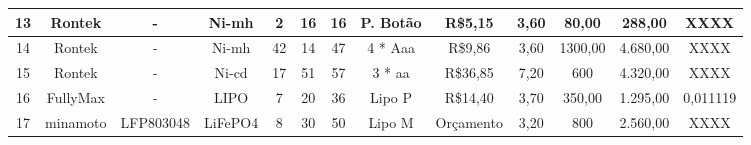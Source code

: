 \begin{table}[htp]
\begin{tabular}{|c|c|c|c|c|c|c|c|c|c|c|c|c|}
13                                               & Rontek                                      & -                                            & Ni-mh                                                & 2          & 16        & 16        & P. Botão                                                & R\$5,15                                     & 3,60                                                     & 80,00                                     & 288,00                                   & XXXX                                           \\[2pt] \hline
14                                               & Rontek                                      & -                                            & Ni-mh                                                & 42         & 14        & 47        & 4 * Aaa                                                 & R\$9,86                                     & 3,60                                                     & 1300,00                                   & 4.680,00                                 & XXXX                                           \\[2pt] \hline
15                                               & Rontek                                      & -                                            & Ni-cd                                                & 17         & 51        & 57        & 3 * aa                                                  & R\$36,85                                    & 7,20                                                     & 600                                       & 4.320,00                                 & XXXX                                           \\[2pt] \hline
16                                               & FullyMax                                    & -                                            & LIPO                                                 & 7          & 20        & 36        & Lipo P                                                  & R\$14,40                                    & 3,70                                                     & 350,00                                    & 1.295,00                                 & 0,011119                                       \\[2pt] \hline
17                                               & minamoto                                    & LFP803048                                    & LiFePO4                                              & 8          & 30        & 50        & Lipo M                                                  & Orçamento                                   & 3,20                                                     & 800                                       & 2.560,00                                 & XXXX                                           \\[2pt] \hline

\end{tabular}
\end{table}
